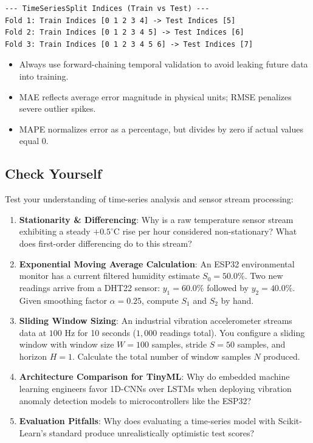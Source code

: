 \begin{lstlisting}[style=outputstyle]
--- TimeSeriesSplit Indices (Train vs Test) ---
Fold 1: Train Indices [0 1 2 3 4] -> Test Indices [5]
Fold 2: Train Indices [0 1 2 3 4 5] -> Test Indices [6]
Fold 3: Train Indices [0 1 2 3 4 5 6] -> Test Indices [7]
\end{lstlisting}

\begin{takeaways}
\begin{itemize}
    \item Always use forward-chaining temporal validation to avoid leaking future data into training.
    \item MAE reflects average error magnitude in physical units; RMSE penalizes severe outlier spikes.
    \item MAPE normalizes error as a percentage, but divides by zero if actual values equal $0$.
\end{itemize}
\end{takeaways}

\subsection{Check Yourself}

Test your understanding of time-series analysis and sensor stream processing:

\begin{enumerate}
    \item \textbf{Stationarity \& Differencing}: Why is a raw temperature sensor stream exhibiting a steady $+0.5^\circ\text{C}$ rise per hour considered non-stationary? What does first-order differencing do to this stream?

    \item \textbf{Exponential Moving Average Calculation}: An ESP32 environmental monitor has a current filtered humidity estimate $S_0 = 50.0\%$. Two new readings arrive from a DHT22 sensor: $y_1 = 60.0\%$ followed by $y_2 = 40.0\%$. Given smoothing factor $\alpha = 0.25$, compute $S_1$ and $S_2$ by hand.

    \item \textbf{Sliding Window Sizing}: An industrial vibration accelerometer streams data at $100\text{ Hz}$ for 10 seconds ($1{,}000$ readings total). You configure a sliding window with window size $W = 100$ samples, stride $S = 50$ samples, and horizon $H = 1$. Calculate the total number of window samples $N$ produced.

    \item \textbf{Architecture Comparison for TinyML}: Why do embedded machine learning engineers favor 1D-CNNs over LSTMs when deploying vibration anomaly detection models to microcontrollers like the ESP32?

    \item \textbf{Evaluation Pitfalls}: Why does evaluating a time-series model with Scikit-Learn's standard  produce unrealistically optimistic test scores?
\end{enumerate}

